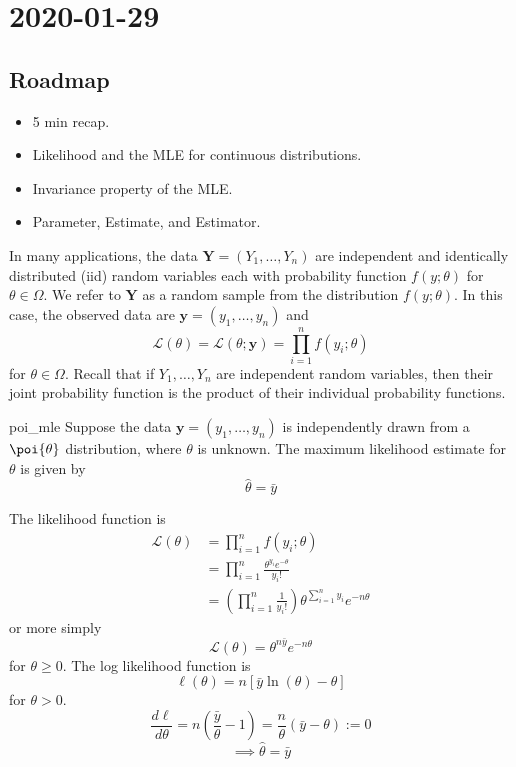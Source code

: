 \section{2020-01-29}
\subsection*{Roadmap}
\begin{itemize}
    \item 5 min recap.
    \item Likelihood and the MLE for continuous distributions.
    \item Invariance property of the MLE\@.
    \item Parameter, Estimate, and Estimator.
\end{itemize}

\begin{Definition}{}{}
    In many applications, the data $ \symbf{Y}=(Y_1,\ldots ,Y_n) $ are independent
    and identically distributed (iid) random variables each with probability function
    $ f(y;\theta) $ for $ \theta\in\Omega $. We refer to $ \symbf{Y} $
    as a random sample from the distribution $ f(y;\theta) $. In this case,
    the observed data are $ \symbf{y}=(y_1,\ldots ,y_n) $ and
    \[ \mathcal{L}(\theta)=\mathcal{L}(\theta;\symbf{y})=\prod_{i=1}^n f(y_i;\theta) \]
    for $ \theta\in\Omega $. Recall that if $ Y_1,\ldots ,Y_n $ are
    independent random variables, then their joint probability function is
    the product of their individual probability functions.
\end{Definition}



\begin{Proposition}{}{poi_mle}
    Suppose the data $ \symbf{y}=(y_1,\ldots ,y_n) $ is independently
    drawn from a $ \poi{\theta} $ distribution, where $ \theta $ is unknown.
    The maximum likelihood estimate for $ \theta $ is given by
    \[ \hat{\theta}=\bar{y} \]
\end{Proposition}

\begin{Proof}{}{}
    The likelihood function is
    \begin{align*}
        \mathcal{L}(\theta) & =
        \prod_{i=1}^n f(y_i;\theta)                                               \\
                            & =\prod_{i=1}^n \frac{\theta^{y_i}e^{-\theta}}{y_i!} \\
                            & =\left( \prod_{i=1}^n  \frac{1}{y_i!} \right)
        \theta^{\sum\limits_{i=1}^{n} y_i}e^{-n\theta}
    \end{align*}
    or more simply
    \[ \mathcal{L}(\theta)=\theta^{n\bar{y}}e^{-n\theta} \]
    for $ \theta\geqslant 0 $. The log likelihood function is
    \[ \ell(\theta)=n\left[ \bar{y}\ln(\theta)-\theta \right] \]
    for $ \theta>0 $.
    \[ \frac{d\ell}{d\theta} =n\left( \frac{\bar{y}}{\theta}-1 \right)=\frac{n}{\theta}
        \left( \bar{y}-\theta \right):=0 \]
    \[ \implies \hat{\theta}=\bar{y} \]
\end{Proof}



